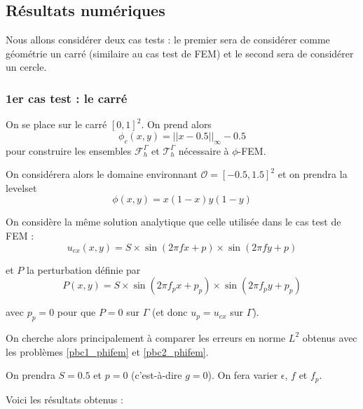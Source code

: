 \documentclass[french]{article}
\begin{document}
	\subsection{Résultats numériques}
	
	Nous allons considérer deux cas tests : le premier sera de considérer comme géométrie un carré (similaire au cas test de FEM) et le second sera de considérer un cercle.
	
	\subsubsection*{1er cas test : le carré}
	
	On se place sur le carré $[0,1]^2$. On prend alors
	$$\phi_c (x,y)=||x-0.5||_\infty-0.5$$
	pour construire les ensembles $\mathcal{F}_h^\Gamma$ et $\mathcal{T}_h^\Gamma$ nécessaire à $\phi$-FEM.
	
	On considérera alors le domaine environnant $\mathcal{O}=[-0.5,1.5]^2$ et on prendra la levelset
	$$\phi (x,y)=x(1-x)y(1-y)$$
	
	On considère la même solution analytique que celle utilisée dans le cas test de FEM :
	$$u_{ex}(x,y) = S\times\sin(2\pi fx + p)\times\sin(2\pi fy + p)$$ 
	
	et $P$ la perturbation définie par
	$$P(x,y)=S\times\sin(2\pi f_px + p_p)\times\sin(2\pi f_py + p_p)$$
	
	avec $p_p=0$ pour que $P=0$ sur $\Gamma$ (et donc $u_p=u_{ex}$ sur $\Gamma$). 
	
	On cherche alors principalement à comparer les erreurs en norme $L^2$ obtenus avec les problèmes \ref{pbc1_phifem} et \ref{pbc2_phifem}.
	
	On prendra $S=0.5$ et $p=0$ (c'est-à-dire $g=0$). On fera varier $\epsilon$, $f$ et $f_p$. 
	
	Voici les résultats obtenus :
	
\end{document}
